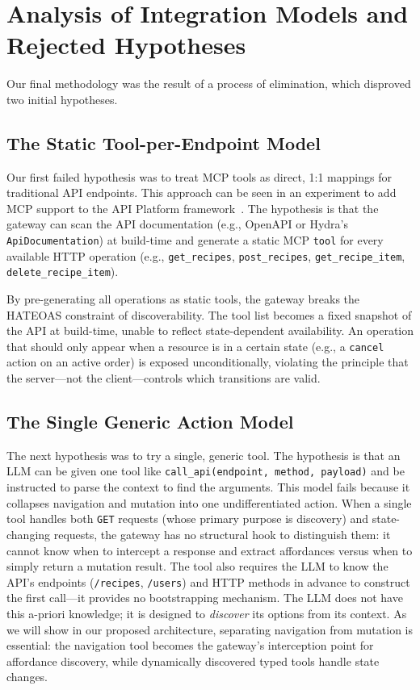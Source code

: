 \documentclass[11pt,a4paper]{article}
\begin{document}
\section{Analysis of Integration Models and Rejected Hypotheses}

Our final methodology was the result of a process of elimination, which disproved two initial hypotheses.

\subsection{The Static Tool-per-Endpoint Model}

Our first failed hypothesis was to treat MCP tools as direct, 1:1 mappings for traditional API endpoints. This approach can be seen in an experiment to add MCP support to the API Platform framework~\cite{api-platform-mcp}. The hypothesis is that the gateway can scan the API documentation (e.g., OpenAPI or Hydra's \texttt{ApiDocumentation}) at build-time and generate a static MCP \texttt{tool} for every available HTTP operation (e.g., \texttt{get\_recipes}, \texttt{post\_recipes}, \texttt{get\_recipe\_item}, \texttt{delete\_recipe\_item}).

By pre-generating all operations as static tools, the gateway breaks the HATEOAS constraint of discoverability. The tool list becomes a fixed snapshot of the API at build-time, unable to reflect state-dependent availability. An operation that should only appear when a resource is in a certain state (e.g., a \texttt{cancel} action on an active order) is exposed unconditionally, violating the principle that the server---not the client---controls which transitions are valid.

\subsection{The Single Generic Action Model}

The next hypothesis was to try a single, generic tool. The hypothesis is that an LLM can be given one tool like \texttt{call\_api(endpoint, method, payload)} and be instructed to parse the context to find the arguments. This model fails because it collapses navigation and mutation into one undifferentiated action. When a single tool handles both \texttt{GET} requests (whose primary purpose is discovery) and state-changing requests, the gateway has no structural hook to distinguish them: it cannot know when to intercept a response and extract affordances versus when to simply return a mutation result. The tool also requires the LLM to know the API's endpoints (\texttt{/recipes}, \texttt{/users}) and HTTP methods in advance to construct the first call---it provides no bootstrapping mechanism. The LLM does not have this a-priori knowledge; it is designed to \emph{discover} its options from its context. As we will show in our proposed architecture, separating navigation from mutation is essential: the navigation tool becomes the gateway's interception point for affordance discovery, while dynamically discovered typed tools handle state changes.
\end{document}
